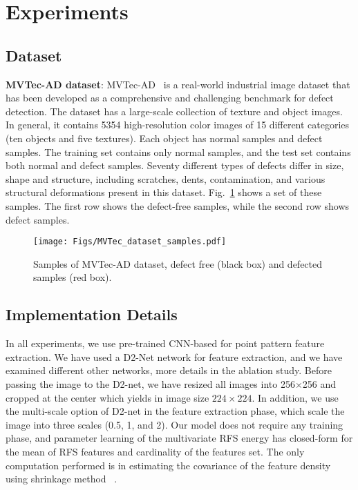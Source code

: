 \documentclass[journal]{IEEEtran}
\let\MYoriglatexcaption\caption
\renewcommand{\caption}[2][\relax]{\MYoriglatexcaption[#2]{#2}}
\begin{document}
\section{Experiments}
\label{Sec:experiments}
\subsection{Dataset}
\textbf{MVTec-AD dataset}:
MVTec-AD~\cite{bergmann2019mvtec} is a real-world industrial image dataset that has been developed as a comprehensive and challenging benchmark for defect detection. The dataset has a large-scale collection of texture and object images. In general, it contains 5354 high-resolution color images of 15 different categories (ten objects and five textures). Each object has normal samples and defect samples. The training set contains only normal samples, and the test set contains both normal and defect samples. Seventy different types of defects differ in size, shape and structure, including scratches, dents, contamination, and various structural deformations present in this dataset.
Fig.~\ref{Mvtec} shows a set of these samples. The first row shows the defect-free samples, while the second row shows defect samples.
\begin{figure}[ht!]
	\texttt{[image: Figs/MVTec\_dataset\_samples.pdf]}
	\caption{Samples of MVTec-AD dataset, defect free (black box) and defected samples (red box).}
	\label{Mvtec}
\end{figure}

\subsection{Implementation Details}

In all experiments, we use pre-trained CNN-based for point pattern feature extraction. We have used a D2-Net network for feature extraction, and we have examined different other networks, more details in the ablation study. Before passing the image to the D2-net, we have resized all images into 256$\times$256 and cropped at the center which yields in image size $224 \times 224$. In addition, we use the multi-scale option of D2-net in the feature extraction phase, which scale the image into three scales (0.5, 1, and 2). Our model does not require any training phase, and parameter learning of the multivariate RFS energy has closed-form for the mean of RFS features and cardinality of the features set. The only computation performed is in estimating the covariance of the feature density using shrinkage method ~\cite{ledoit2004well}.
\end{document}
